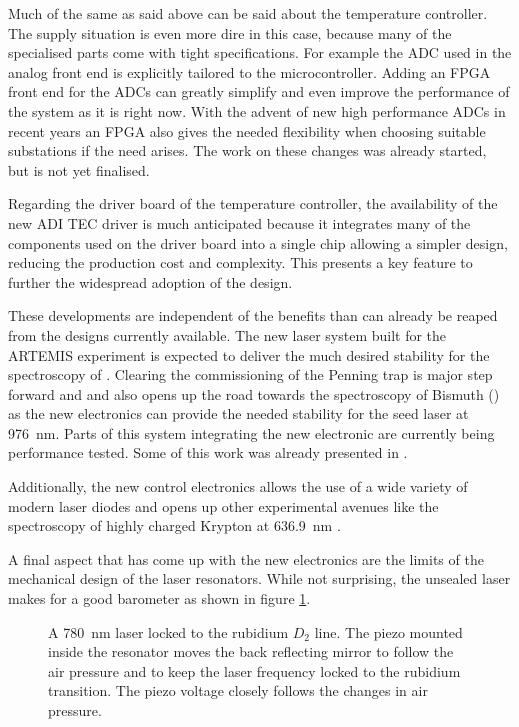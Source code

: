 Much of the same as said above can be said about the temperature controller. The supply situation is even more dire in this case, because many of the specialised parts come with tight specifications. For example the  ADC used in the analog front end is explicitly tailored to the microcontroller. Adding an FPGA front end for the ADCs can greatly simplify and even improve the performance of the system as it is right now. With the advent of new high performance ADCs in recent years an FPGA also gives the needed flexibility when choosing suitable substations if the need arises. The work on these changes was already started, but is not yet finalised.

Regarding the driver board of the temperature controller, the availability of the new ADI  TEC driver is much anticipated because it integrates many of the components used on the driver board into a single chip allowing a simpler design, reducing the production cost and complexity. This presents a key feature to further the widespread adoption of the design.

These developments are independent of the benefits than can already be reaped from the designs currently available. The new laser system built for the ARTEMIS experiment is expected to deliver the much desired stability for the spectroscopy of . Clearing the commissioning of the Penning trap is major step forward and and also opens up the road towards the spectroscopy of Bismuth () as the new electronics can provide the needed stability for the seed laser at \qty{976}{\nm}. Parts of this system integrating the new electronic are currently being performance tested. Some of this work was already presented in \cite{thesis_tilman}.

Additionally, the new control electronics allows the use of a wide variety of modern laser diodes and opens up other experimental avenues like the spectroscopy of highly charged Krypton  at \qty{636.9}{\nm} \cite{krypton17+,krypton17+_2}.

A final aspect that has come up with the new electronics are the limits of the mechanical design of the laser resonators. While not surprising, the unsealed laser makes for a good barometer as shown in figure \ref{fig:atomics_master_barometer}.
\begin{figure}[ht]
    \centering
    
    \caption{A \qty{780}{\nm} laser locked to the rubidium  $D_2$ line. The piezo mounted inside the resonator moves the back reflecting mirror to follow the air pressure and to keep the laser frequency locked to the rubidium transition. The piezo voltage closely follows the changes in air pressure.}
    \label{fig:atomics_master_barometer}
\end{figure}

